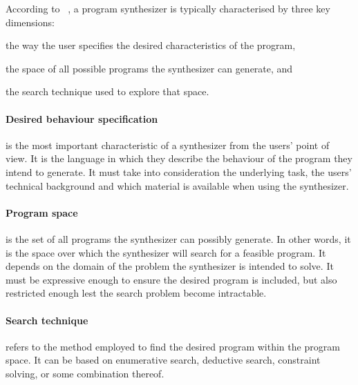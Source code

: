 According to \citeauthor{PSnow}~\cite{DBLP:conf/ppdp/Gulwani10,PSnow}, a program synthesizer is typically characterised by three key dimensions:
\begin{enumerate*}[label=(\roman*)]
  \item the way the user specifies the desired characteristics of the program,
  \item the space of all possible programs the synthesizer can generate, and
  \item the search technique used to explore that space.
\end{enumerate*}

\paragraph{Desired behaviour specification} is the most important characteristic of a synthesizer from the users' point of view. It is the language in which they describe the behaviour of the program they intend to generate. It must take into consideration the underlying task, the users' technical background and which material is available when using the synthesizer.

\paragraph{Program space} is the set of all programs the synthesizer can possibly generate. In other words, it is the space over which the synthesizer will search for a feasible program. It depends on the domain of the problem the synthesizer is intended to solve. It must be expressive enough to ensure the desired program is included, but also restricted enough lest the search problem become intractable.

\paragraph{Search technique} refers to the method employed to find the desired program within the program space. It can be based on enumerative search, deductive search, constraint solving, or some combination thereof.


